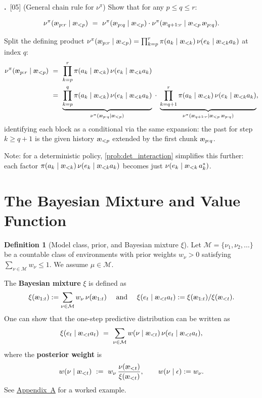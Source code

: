\documentclass[fontsize=11pt, parskip=half]{scrartcl}
\theoremstyle{definition}
\newtheorem{definition}[theorem]{Definition}
\newenvironment{solution}{%
    \begin{tcolorbox}[colback=black!5!white, colframe=black!50!white,
      title={\textbf{Solution}}, fonttitle=\normalfont, breakable]
  }{\end{tcolorbox}}
\newenvironment{solution}{\expandafter\comment}{\expandafter\endcomment}
\newcommand{\mysubsection}[2]{\par\medskip\noindent\refstepcounter{subsection}\textbf{\thesubsection.}~#2\par\smallskip}
\newcommand{\cM}{\mathcal{M}}
\newcommand{\aes}{\textnormal{\ae}}
\begin{document}
\mysubsection{5}{[05] (General chain rule for $\nu^\pi$)\label{prob:chain_rule_nupi}
Show that for any $p \leq q \leq r$:}
\[
    \nu^\pi(\aes_{p:r} \mid \aes_{<p}) ~=~ \nu^\pi(\aes_{p:q} \mid \aes_{<p}) \cdot \nu^\pi(\aes_{q+1:r} \mid \aes_{<p}\, \aes_{p:q}).
\]

\begin{solution}
Split the defining product $\nu^\pi(\aes_{p:r} \mid \aes_{<p}) = \prod_{k=p}^r \pi(a_k \mid \aes_{<k})\, \nu(e_k \mid \aes_{<k} a_k)$ at index $q$:
\begin{align*}
    \nu^\pi(\aes_{p:r} \mid \aes_{<p})
    ~&=~ \prod_{k=p}^r \pi(a_k \mid \aes_{<k})\, \nu(e_k \mid \aes_{<k} a_k)\\
    ~&=~ \underbrace{\prod_{k=p}^{q} \pi(a_k \mid \aes_{<k})\, \nu(e_k \mid \aes_{<k} a_k)}_{\nu^\pi(\aes_{p:q} \mid \aes_{<p})}
    \;\cdot\; \underbrace{\prod_{k=q+1}^{r} \pi(a_k \mid \aes_{<k})\, \nu(e_k \mid \aes_{<k} a_k)}_{\nu^\pi(\aes_{q+1:r} \mid \aes_{<p}\, \aes_{p:q})},
\end{align*}
identifying each block as a conditional via the same expansion: the past for step $k \geq q+1$ is the given history $\aes_{<p}$ extended by the first chunk $\aes_{p:q}$.

Note: for a deterministic policy, \cref{prob:det_interaction} simplifies this further: each factor $\pi(a_k \mid \aes_{<k})\, \nu(e_k \mid \aes_{<k} a_k)$ becomes just $\nu(e_k \mid \aes_{<k}\, a^*_k)$.
\end{solution}


\section*{The Bayesian Mixture and Value Function}

\begin{definition}[Model class, prior, and Bayesian mixture $\xi$]\label{def:mixture}
Let $\cM = \{\nu_1, \nu_2, \ldots\}$ be a countable class of environments with prior weights $w_\nu > 0$ satisfying $\sum_{\nu \in \cM} w_\nu \leq 1$.
We assume $\mu \in \cM$.

The \textbf{Bayesian mixture} $\xi$ is defined as 
$$
\xi(\aes_{1:t}) := \sum_{\nu \in \cM} w_\nu\, \nu(\aes_{1:t}) \quad \text{ and } \quad \xi(e_t \mid \aes_{<t} a_t) := \xi(\aes_{1:t}) / \xi(\aes_{<t}).
$$
One can show that the one-step predictive distribution can be written as
\[
    \xi(e_t \mid \aes_{<t} a_t)
    ~=~ \sum_{\nu \in \cM} w(\nu \mid \aes_{<t})\, \nu(e_t \mid \aes_{<t} a_t),
\]
where the \textbf{posterior weight} is
\[
    w(\nu \mid \aes_{<t})
    ~:=~ w_\nu \,\frac{\nu(\aes_{<t})}{\xi(\aes_{<t})},
    \qquad w(\nu \mid \epsilon) := w_\nu.
\]
See \hyperref[sec:appendix_mixture]{Appendix~A} for a worked example.
\end{definition}
\end{document}
